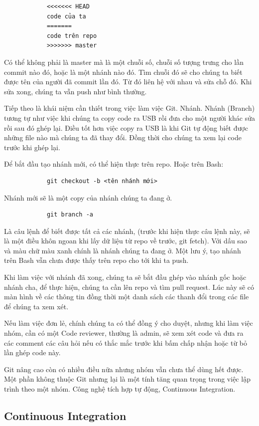 \documentclass[12pt,a4paper]{report}
\begin{document}
			\begin{verbatim}
			<<<<<<< HEAD
			code của ta
			=======
			code trên repo
			>>>>>>> master
			\end{verbatim}
			Có thể không phải là master mà là một chuỗi số, chuỗi số tượng trưng cho lần commit nào đó, hoặc là một nhánh nào đó. Tìm chuỗi đó sẽ cho chúng ta biết được tên của người đã commit lần đó. Từ đó liên hệ với nhau và sửa chỗ đó. Khi sửa xong, chúng ta vẫn push như bình thường.\par

			Tiếp theo là khái niệm cần thiết trong việc làm việc Git. Nhánh. Nhánh (Branch) tương tự như việc khi chúng ta copy code ra USB rồi đưa cho một người khác sửa rồi sau đó ghép lại. Điều tốt hơn việc copy ra USB là khi Git tự động biết được những file nào mà chúng ta đã thay đổi. Đồng thời cho chúng ta xem lại code trước khi ghép lại.\par
			Để bắt đầu tạo nhánh mới, có thể hiện thực trên repo. Hoặc trên Bash:
			\begin{verbatim}
			git checkout -b <tên nhánh mới>
			\end{verbatim}
			Nhánh mới sẽ là một copy của nhánh chúng ta đang ở.
			\begin{verbatim}
			git branch -a
			\end{verbatim}
			Là câu lệnh để biết được tất cả các nhánh, (trước khi hiện thực câu lệnh này, sẽ là một điều khôn ngoan khi lấy dữ liệu từ repo về trước, git fetch). Với dấu sao và màu chữ màu xanh chính là nhánh chúng ta đang ở. Một lưu ý, tạo nhánh trên Bash vẫn chưa được thấy trên repo cho tới khi ta push.\par
			Khi làm việc với nhánh đã xong, chúng ta sẽ bắt đầu ghép vào nhánh gốc hoặc nhánh cha, để thực hiện, chúng ta cần lên repo và tìm pull request. Lúc này sẽ có màn hình về các thông tin đồng thời một danh sách các thanh đổi trong các file để chúng ta xem xét.\par
			Nếu làm việc đơn lẻ, chính chúng ta có thể đồng ý cho duyệt, nhưng khi làm việc nhóm, cần có một Code reviewer, thường là admin, sẽ xem xét code và đưa ra các comment các câu hỏi nếu có thắc mắc trước khi bấm chấp nhận hoặc từ bỏ lần ghép code này.\par
			Git nâng cao còn có nhiều điều nữa nhưng nhóm vẫn chưa thể dùng hết được. Một phần không thuộc Git nhưng lại là một tính tăng quan trọng trong việc lập trình theo một nhóm. Công nghệ tích hợp tự động, Continuous Integration.

			\subsection{Continuous Integration}
\end{document}
